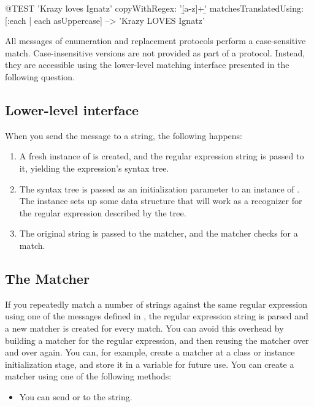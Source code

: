 \documentclass[a4paper,10pt,twoside]{book}
\begin{document}
{\begin{code}{@TEST}
'Krazy loves Ignatz' copyWithRegex: '\b[a-z]+\b' matchesTranslatedUsing: [:each | each asUppercase] --> 'Krazy LOVES Ignatz'
\end{code}

All messages of enumeration and replacement protocols perform a case-sensitive match.  Case-insensitive versions are not provided as part of a  protocol.  Instead, they are accessible using the lower-level matching interface presented in the following question.
\subsection{Lower-level interface}

When you send the message  to a string, the following happens:

\begin{enumerate}
\item A fresh instance of  is created, and the regular expression string is passed to it, yielding the expression's syntax tree.
\item  The syntax tree is passed as an initialization parameter to an instance of . The instance sets up some data structure that will work as a recognizer for the regular expression described by the tree.
\item The original string is passed to the matcher, and the matcher checks for a match.
\end{enumerate}

\subsection{The Matcher}

If you repeatedly match a number of strings against the same regular expression using one of the messages defined in , the regular expression string is parsed and a new matcher is created for every match.  You can avoid this overhead by building a matcher for the regular expression, and then reusing the matcher over and over again. You can, for example, create a matcher at a class or instance initialization stage, and store it in a variable for future use.
You can create a matcher using one of the following methods:

\begin{itemize}
\item You can send  or  to the string.


\end{itemize}}
\end{document}
